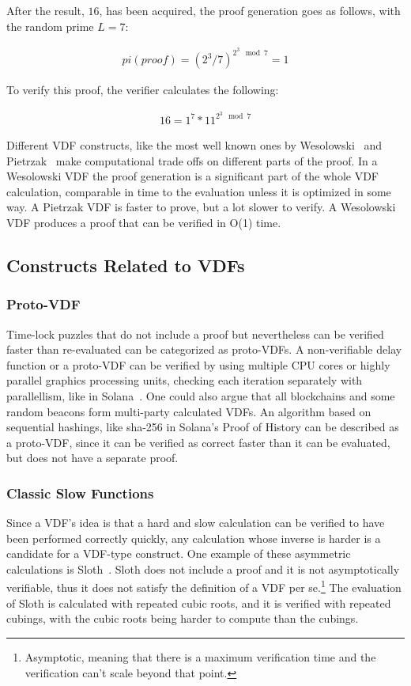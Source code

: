 After the result, \(16\), has been acquired, the proof generation goes as follows, with the random prime \(L=7\):

\begin{align*}
	pi (\mathit{proof}) = (2^3/7)^{2^3\mod 7} = 1
\end{align*}

To verify this proof, the verifier calculates the following:

\begin{align*}
	16 = 1^7 * 11^{2^3 \mod 7}
\end{align*}

Different VDF constructs, like the most well known ones by Wesolowski~\cite{Wesolowski2018-rf} and Pietrzak~\cite{Pietrzak2018-xs} make computational trade offs on different parts of the proof. In a Wesolowski VDF the proof generation is a significant part of the whole VDF calculation, comparable in time to the evaluation unless it is optimized in some way. A Pietrzak VDF is faster to prove, but a lot slower to verify. A Wesolowski VDF produces a proof that can be verified in O(1) time.

\subsection{Constructs Related to VDFs}
\subsubsection{Proto-VDF}
Time-lock puzzles that do not include a proof but nevertheless can be verified faster than re-evaluated can be categorized as proto-VDFs. A non-verifiable delay function or a proto-VDF can be verified by using multiple CPU cores or highly parallel graphics processing units, checking each iteration separately with parallellism, like in Solana~\cite{Yakovenko2018-zn}. One could also argue that all blockchains and some random beacons form multi-party calculated VDFs. An algorithm based on sequential hashings, like sha-256 in Solana's Proof of History can be described as a proto-VDF, since it can be verified as correct faster than it can be evaluated, but does not have a separate proof.

\subsubsection{Classic Slow Functions}
Since a VDF's idea is that a hard and slow calculation can be verified to have been performed correctly quickly, any calculation whose inverse is harder is a candidate for a VDF-type construct. One example of these asymmetric calculations is Sloth~\cite{Boneh2018-sm}. Sloth does not include a proof and it is not asymptotically verifiable, thus it does not satisfy the definition of a VDF per se.\footnote{Asymptotic, meaning that there is a maximum verification time and the verification can't scale beyond that point.} The evaluation of Sloth is calculated with repeated cubic roots, and it is verified with repeated cubings, with the cubic roots being harder to compute than the cubings.

